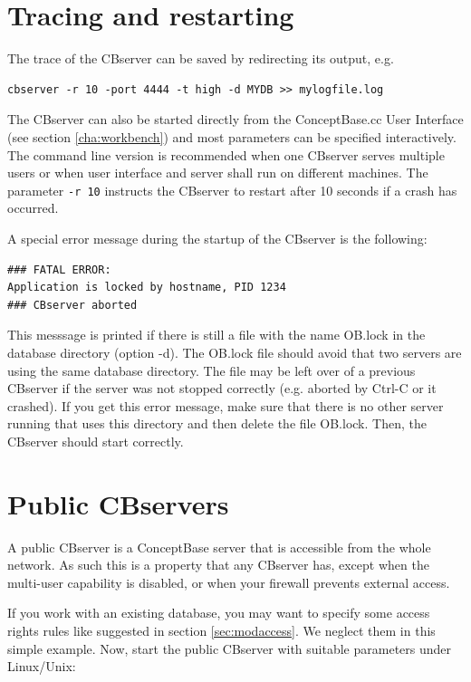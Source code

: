 \section{Tracing and restarting}

\vspace{0.5cm}
The trace of the CBserver can be saved by redirecting its
output, e.g.

\begin{verbatim}
cbserver -r 10 -port 4444 -t high -d MYDB >> mylogfile.log
\end{verbatim}

The CBserver can also be started directly from the ConceptBase.cc
User Interface (see section \ref{cha:workbench}) and most parameters can
be specified interactively. The command line version is recommended when
one CBserver serves multiple users or when user interface and server shall run
on different machines.
The parameter {\tt -r 10} instructs the CBserver to restart after 10 seconds if 
a crash has occurred.




A special error message during the startup of the CBserver
is the following:
\begin{verbatim}
### FATAL ERROR:
Application is locked by hostname, PID 1234 
### CBserver aborted
\end{verbatim}
This messsage is printed if there is still a file with the name OB.lock
in the database directory (option -d). The OB.lock file should avoid that
two servers are using the same database directory. The file may be left over of a previous
CBserver if the server was not stopped correctly (e.g. aborted by Ctrl-C or it crashed).
If you get this error message, make sure that there is no other server running
that uses this directory and then delete the file OB.lock. Then, the 
CBserver should start correctly.


\section{Public CBservers}
\label{sec:pubcbserver}

A public CBserver is a ConceptBase server that is accessible from 
the whole network. As such this is a property that any CBserver has, except when
the multi-user capability is disabled, or when your firewall prevents
external access.

If you work with an existing database, you may want to specify some access rights rules like suggested in section \ref{sec:modaccess}.
We neglect them in this simple example.
Now, start the public CBserver with suitable parameters under Linux/Unix:

